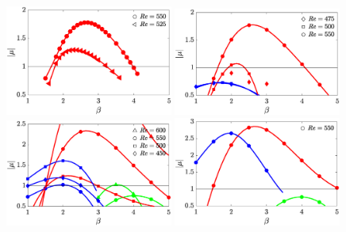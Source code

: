 \documentclass{jfm}
\begin{document}


\begin{figure}
  \centering
%  
%  
%    
%  
  \includegraphics[width=0.49\textwidth]{./fig/AR5s/multipliers_AR5.eps}
  \includegraphics[width=0.49\textwidth]{./fig/AR5s/multipliers_AR5p25.eps}  
  \includegraphics[width=0.49\textwidth]{./fig/AR5s/multipliers_AR5p5.eps}  
  \includegraphics[width=0.49\textwidth]{./fig/AR5s/multipliers_AR5p75.eps}      
  \vspace{0.1cm}
\end{figure}
\end{document}
